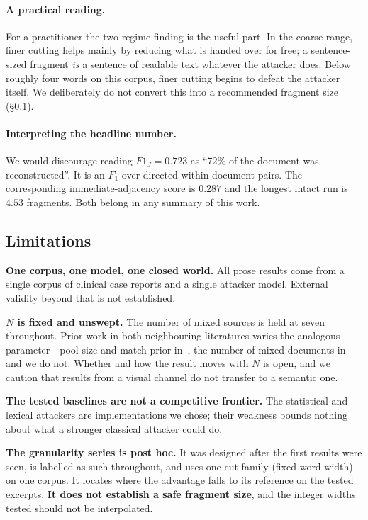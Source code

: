 \documentclass[sigconf,nonacm]{acmart}
\newcommand{\FJ}{\ensuremath{F1_J}}
\begin{document}
\paragraph{A practical reading.}
For a practitioner the two-regime finding is the useful part. In the coarse
range, finer cutting helps mainly by reducing what is handed over for free; a
sentence-sized fragment \emph{is} a sentence of readable text whatever the
attacker does. Below roughly four words on this corpus, finer cutting begins to
defeat the attacker itself. We deliberately do not convert this into a
recommended fragment size (\S\ref{sec:limitations}).

\paragraph{Interpreting the headline number.}
We would discourage reading $\FJ = 0.723$ as ``$72\%$ of the document was
reconstructed''. It is an $F_1$ over directed within-document pairs. The
corresponding immediate-adjacency score is $0.287$ and the longest intact run is
$4.53$ fragments. Both belong in any summary of this work.

\subsection{Limitations}
\label{sec:limitations}

\textbf{One corpus, one model, one closed world.} All prose results come from a
single corpus of clinical case reports and a single attacker model. External
validity beyond that is not established.

\textbf{$N$ is fixed and unswept.} The number of mixed sources is held at seven
throughout. Prior work in both neighbouring literatures varies the analogous
parameter---pool size and match prior in~\cite{lermen2026}, the number of mixed
documents in~\cite{paixao2020}---and we do not. Whether and how the result moves
with $N$ is open, and we caution that results from a visual channel do not
transfer to a semantic one.

\textbf{The tested baselines are not a competitive frontier.} The statistical and
lexical attackers are implementations we chose; their weakness bounds nothing
about what a stronger classical attacker could do.

\textbf{The granularity series is post hoc.} It was designed after the first
results were seen, is labelled as such throughout, and uses one cut family
(fixed word width) on one corpus. It locates where the advantage falls to its
reference on the tested excerpts. \textbf{It does not establish a safe fragment
size}, and the integer widths tested should not be interpolated.
\end{document}
